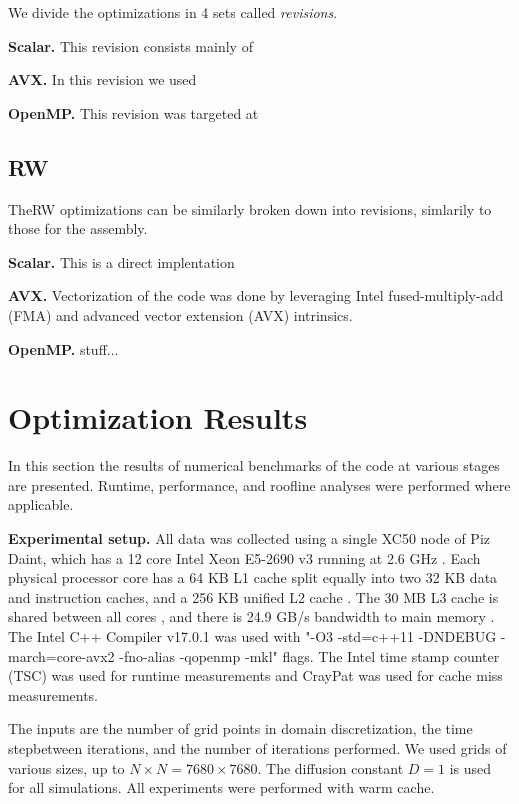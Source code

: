 \documentclass[letterpaper]{article}
\newcommand{\mypar}[1]{{\bf #1.}}
\begin{document}
We divide the optimizations in 4 sets called \textit{revisions}.

\mypar{Scalar}
This revision consists mainly of 

\mypar{AVX}
In this revision we used

\mypar{OpenMP}
This revision was targeted at 


\subsection{RW}\label{subsec:RW_method}

TheRW optimizations can be similarly broken down into revisions, simlarily to those for the assembly.

\mypar{Scalar}
This is a direct implentation

\mypar{AVX}
Vectorization of the code was done by leveraging Intel fused-multiply-add (FMA) and advanced vector extension (AVX) intrinsics.

\mypar{OpenMP}
stuff...


\section{Optimization Results}\label{sec:results}

In this section the results of numerical benchmarks of the code at various stages are presented. Runtime, performance, and roofline analyses were performed where applicable.

\mypar{Experimental setup}
All data was collected using a single XC50 node of Piz Daint, which has a 12 core Intel Xeon E5-2690 v3 running at 2.6 GHz \cite{daint}. Each physical processor core has a 64 KB L1 cache split equally into two 32 KB data and instruction caches, and a 256 KB unified L2 cache \cite{cpu_world}. The 30 MB L3 cache is shared between all cores \cite{ark_intel}, and there is 24.9 GB/s bandwidth to main memory \cite{7_cpu}. The Intel C++ Compiler v17.0.1 was used with "-O3 -std=c++11 -DNDEBUG -march=core-avx2 -fno-alias -qopenmp -mkl" flags. The Intel time stamp counter (TSC) was used for runtime measurements and CrayPat was used for cache miss measurements.

The inputs are the number of grid points in domain discretization, the time stepbetween iterations, and the number of iterations performed. We used grids of various sizes, up to $N\times N=7680\times7680$. The diffusion constant $D=1$ is used for all simulations. All experiments were performed with warm cache.
\end{document}
